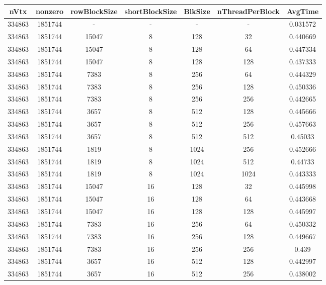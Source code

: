 \documentclass[9pt]{article}
\begin{document}
\SetBgPosition{0.25cm,-5.0cm}
\begin{tabular}{|c|c|c|c|c|c|c| }  
\hline
nVtx  & nonzero  & rowBlockSize  & shortBlockSize  & BlkSize  & nThreadPerBlock  & AvgTime \\
\hline
334863  & 1851744  &  -  & -  & -  & -  &0.031572 \\
\hline
334863  & 1851744  & 15047  & 8  & 128  & 32  & 0.440669 \\
\hline
334863  & 1851744  & 15047  & 8  & 128  & 64  & 0.447334 \\
\hline
334863  & 1851744  & 15047  & 8  & 128  & 128  & 0.437333 \\
\hline
334863  & 1851744  & 7383  & 8  & 256  & 64  & 0.444329 \\
\hline
334863  & 1851744  & 7383  & 8  & 256  & 128  & 0.450336 \\
\hline
334863  & 1851744  & 7383  & 8  & 256  & 256  & 0.442665 \\
\hline
334863  & 1851744  & 3657  & 8  & 512  & 128  & 0.445666 \\
\hline
334863  & 1851744  & 3657  & 8  & 512  & 256  & 0.457663 \\
\hline
334863  & 1851744  & 3657  & 8  & 512  & 512  & 0.45033 \\
\hline
334863  & 1851744  & 1819  & 8  & 1024  & 256  & 0.452666 \\
\hline
334863  & 1851744  & 1819  & 8  & 1024  & 512  & 0.44733 \\
\hline
334863  & 1851744  & 1819  & 8  & 1024  & 1024  & 0.443333 \\
\hline
334863  & 1851744  & 15047  & 16  & 128  & 32  & 0.445998 \\
\hline
334863  & 1851744  & 15047  & 16  & 128  & 64  & 0.443668 \\
\hline
334863  & 1851744  & 15047  & 16  & 128  & 128  & 0.445997 \\
\hline
334863  & 1851744  & 7383  & 16  & 256  & 64  & 0.450332 \\
\hline
334863  & 1851744  & 7383  & 16  & 256  & 128  & 0.449667 \\
\hline
334863  & 1851744  & 7383  & 16  & 256  & 256  & 0.439 \\
\hline
334863  & 1851744  & 3657  & 16  & 512  & 128  & 0.442997 \\
\hline
334863  & 1851744  & 3657  & 16  & 512  & 256  & 0.438002 \\

\end{tabular}
\end{document}
